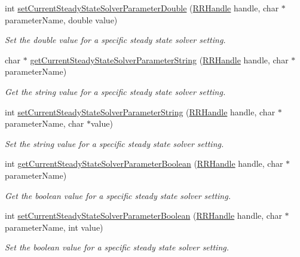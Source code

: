\begin{DoxyCompactItemize}
int \hyperlink{group__simopts_ga6487a043a634ea934606bb7b784403d5}{set\+Current\+Steady\+State\+Solver\+Parameter\+Double} (\hyperlink{rrc__types_8h_a1d68f0592372208fa5a5f2799ea4b3ae}{R\+R\+Handle} handle, char $\ast$parameter\+Name, double value)
\begin{DoxyCompactList}\small\item\em Set the double value for a specific steady state solver setting. \end{DoxyCompactList}\item 
char $\ast$ \hyperlink{group__simopts_gab55ff5d92aab50f66e969d4ce8aa53fe}{get\+Current\+Steady\+State\+Solver\+Parameter\+String} (\hyperlink{rrc__types_8h_a1d68f0592372208fa5a5f2799ea4b3ae}{R\+R\+Handle} handle, char $\ast$parameter\+Name)
\begin{DoxyCompactList}\small\item\em Get the string value for a specific steady state solver setting. \end{DoxyCompactList}\item 
int \hyperlink{group__simopts_ga55010e4ed7f2612113ebbb894473c2f9}{set\+Current\+Steady\+State\+Solver\+Parameter\+String} (\hyperlink{rrc__types_8h_a1d68f0592372208fa5a5f2799ea4b3ae}{R\+R\+Handle} handle, char $\ast$parameter\+Name, char $\ast$value)
\begin{DoxyCompactList}\small\item\em Set the string value for a specific steady state solver setting. \end{DoxyCompactList}\item 
int \hyperlink{group__simopts_ga079741650e3df582e5b51147bb8b47d8}{get\+Current\+Steady\+State\+Solver\+Parameter\+Boolean} (\hyperlink{rrc__types_8h_a1d68f0592372208fa5a5f2799ea4b3ae}{R\+R\+Handle} handle, char $\ast$parameter\+Name)
\begin{DoxyCompactList}\small\item\em Get the boolean value for a specific steady state solver setting. \end{DoxyCompactList}\item 
int \hyperlink{group__simopts_ga65b83fdacb58e594c065c35252c9db57}{set\+Current\+Steady\+State\+Solver\+Parameter\+Boolean} (\hyperlink{rrc__types_8h_a1d68f0592372208fa5a5f2799ea4b3ae}{R\+R\+Handle} handle, char $\ast$parameter\+Name, int value)
\begin{DoxyCompactList}\small\item\em Set the boolean value for a specific steady state solver setting. \end{DoxyCompactList}\end{DoxyCompactItemize}


